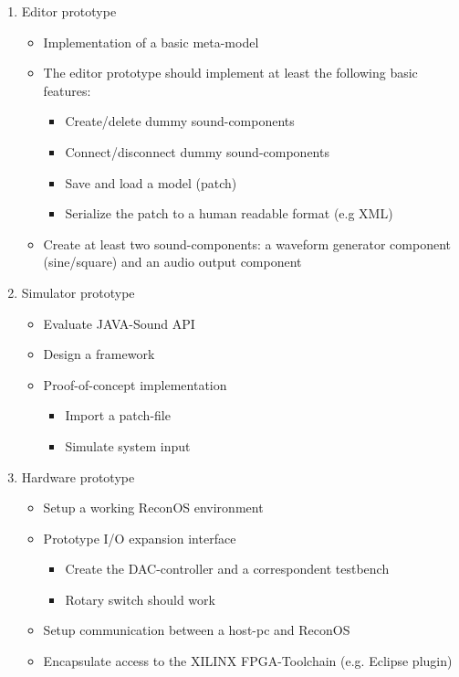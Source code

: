 \begin{enumerate}
	\item Editor prototype
		\begin{itemize}
			\item Implementation of a basic meta-model
			\item The editor prototype should implement at least the following basic features:
				\begin{itemize}
					\item Create/delete dummy sound-components
					\item Connect/disconnect dummy sound-components
					\item Save and load a model (patch)
					\item Serialize the patch to a human readable format (e.g \ac{XML})
				\end{itemize}
			\item Create at least two sound-components: a waveform generator component (sine/square) and an audio output component
		\end{itemize}
	\item Simulator prototype
		\begin{itemize}
			\item Evaluate JAVA-Sound API
			\item Design a framework
			\item Proof-of-concept implementation
			\begin{itemize}
				\item Import a patch-file
				\item Simulate system input
			\end{itemize}
		\end{itemize}
	\item Hardware prototype
		\begin{itemize}
			\item Setup a working ReconOS environment
			\item Prototype I/O expansion interface
			\begin{itemize}
				\item Create the DAC-controller and a correspondent testbench
				\item Rotary switch should work
			\end{itemize}
			\item Setup communication between a host-pc and ReconOS
			\item Encapsulate access to the XILINX \ac{FPGA}-Toolchain (e.g. Eclipse plugin)
		\end{itemize}
\end{enumerate}


